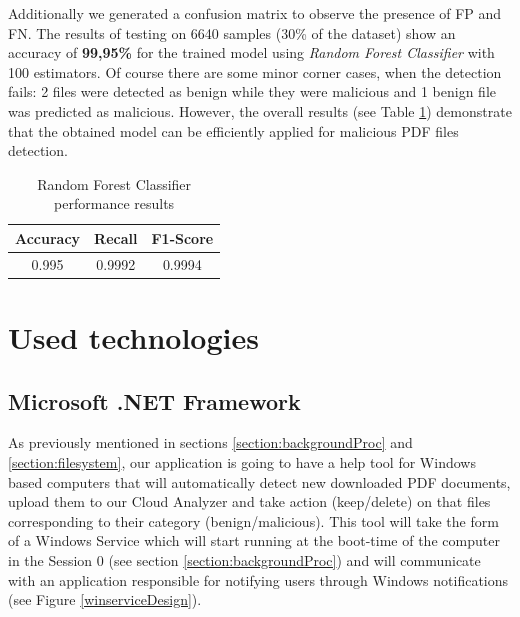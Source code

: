 Additionally we generated a confusion matrix to observe the presence of FP and FN. The results of testing on 6640 samples (30\% of the dataset) show an accuracy of \textbf{99,95\%} for the trained model using \textit{Random Forest Classifier} with 100 estimators. Of course there are some minor corner cases, when the detection fails: 2 files were detected as benign while they were malicious and 1 benign file was predicted as malicious. However, the overall results (see Table \ref{table:results}) demonstrate that the obtained model can be efficiently applied for malicious PDF files detection.

\begin{table}[H]
	\caption{Random Forest Classifier performance results}
	\label{table:results}
        \centering
            \begin{tabular}{c c c}
                \toprule
                
				\textbf{Accuracy} & \textbf{Recall} & \textbf{F1-Score} \\
				\hline 
                0.995 & 0.9992 & 0.9994 \\
                
                \bottomrule
			\end{tabular}
\end{table}


\newpage

\section{Used technologies}
\label{section:technologies}
\subsection{Microsoft .NET Framework}
As previously mentioned in sections \ref{section:backgroundProc} and \ref{section:filesystem}, our application is going to have a help tool for Windows based computers that will automatically detect new downloaded PDF documents, upload them to our Cloud Analyzer and take action (keep/delete) on that files corresponding to their category (benign/malicious). This tool will take the form of a Windows Service which will start running at the boot-time of the computer in the Session 0 (see section \ref{section:backgroundProc}) and will communicate with an application responsible for notifying users through Windows notifications (see Figure \ref{winserviceDesign}). 

